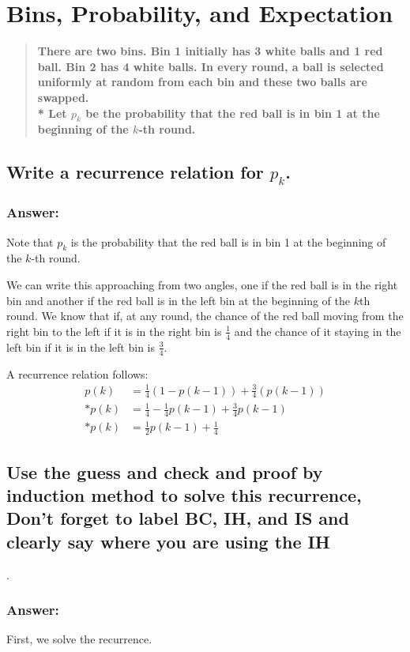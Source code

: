 \documentclass[titlepage]{article}
\theoremstyle{definition}
\begin{document}
\section{Bins, Probability, and Expectation}
\begin{quote}
  \textbf{There are two bins. Bin 1 initially has 3 white balls and 1 red ball.
  Bin 2 has 4 white balls. In every round, a ball is selected uniformly at
  random from each bin and these two balls are swapped. \\*
  Let $p_k$ be the probability that the red ball is in bin 1 at the beginning of
  the $k$-th round.}
\end{quote}

\subsection{ Write a recurrence relation for $p_k$. }
  \subsubsection{Answer:}
    Note that $p_k$ is the probability that the red ball is in bin 1 at the beginning of
    the $k$-th round.

    We can write this approaching from two angles, one if the red ball is in the
    right bin and another if the red ball is in the left bin at the beginning of
    the $k$th round. 
    We know that if, at any round, the chance of the red ball moving from the right
    bin to the left if it is in the right bin is $\frac{1}{4}$ and the chance of it
    staying in the left bin if it is in the left bin is $\frac{3}{4}$. 

    A recurrence relation follows:
    \begin{align}
      p(k) & = \frac{1}{4}\left(1 - p(k-1)\right) + \frac{3}{4}\left(p\left(k-1\right)\right) \\*
      p(k) & = \frac{1}{4} - \frac{1}{4}p(k-1) + \frac{3}{4}p(k-1) \\*
      p(k) & = \frac{1}{2}p(k-1) + \frac{1}{4} 
    \end{align}


\subsection{Use the guess and check and proof by induction method to solve this
	recurrence, Don't forget to label BC, IH, and IS and clearly say where you
	are using the IH}.
  \subsubsection{Answer:}
    First, we solve the recurrence.
\end{document}
